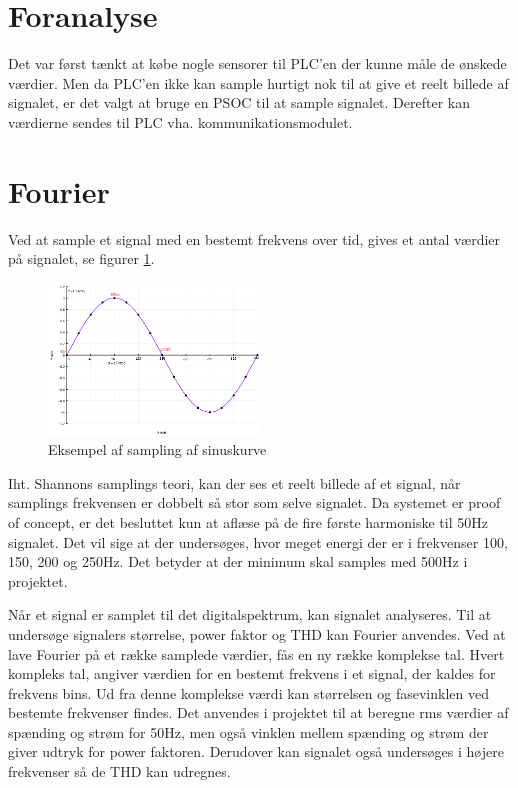 
\section{Foranalyse}
Det var først tænkt at købe nogle sensorer til PLC'en der kunne måle de ønskede værdier. Men da PLC'en ikke kan sample hurtigt nok til at give et reelt billede af signalet, er det valgt at bruge en PSOC til at sample signalet. Derefter kan værdierne sendes til PLC vha. kommunikationsmodulet.

\section{Fourier}
Ved at sample et signal med en bestemt frekvens over tid, gives et antal værdier på signalet, se figurer \ref{fig:sample}.

\begin{figure}[htbp] %
	\centering
	\includegraphics[width=0.5\textwidth]{figure/sampling}
	\caption{Eksempel af sampling af sinuskurve}
	\label{fig:sample}
\end{figure}  

Iht. Shannons samplings teori\cite{Shannon}, kan der ses et reelt billede af et signal, når samplings frekvensen er dobbelt så stor som selve signalet. Da systemet er proof of concept, er det besluttet kun at aflæse på de fire første harmoniske til 50Hz signalet. Det vil sige at der undersøges, hvor meget energi der er i frekvenser 100, 150, 200 og 250Hz. Det betyder at der minimum skal samples med 500Hz i projektet.

Når et signal er samplet til det digitalspektrum, kan signalet analyseres. Til at undersøge signalers størrelse, power faktor og THD kan Fourier anvendes. Ved at lave Fourier på et række samplede værdier, fås en ny række komplekse tal. Hvert kompleks tal, angiver værdien for en bestemt frekvens i et signal, der kaldes for frekvens bins. Ud fra denne komplekse værdi kan størrelsen og fasevinklen ved bestemte frekvenser findes. Det anvendes i projektet til at beregne rms værdier af spænding og strøm for 50Hz, men også vinklen mellem spænding og strøm der giver udtryk for power faktoren. Derudover kan signalet også undersøges i højere frekvenser så de THD kan udregnes.  


